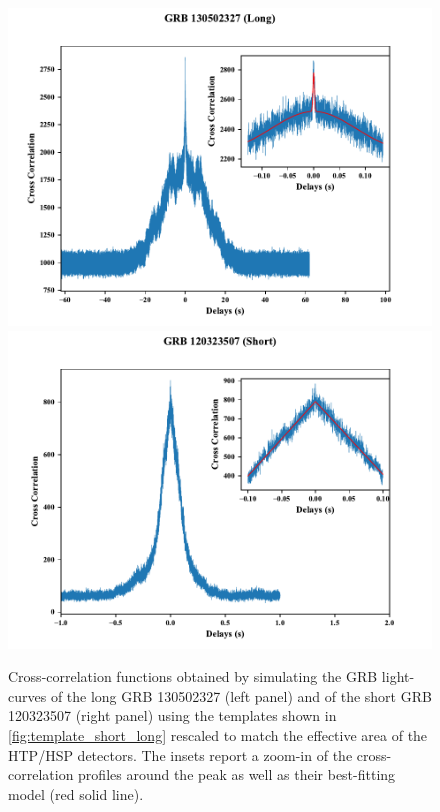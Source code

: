 \documentclass[]{spie}  %
\begin{document}
\begin{figure}[h!]
\centering
\includegraphics[scale=0.52,angle=0]{fig/CrossCorrelation_fit_LONG.pdf}
\includegraphics[scale=0.52,angle=0]{fig/CrossCorrelation_fit_Short.pdf}

\caption{Cross-correlation functions obtained by simulating the GRB light-curves of the long GRB 130502327 (left panel) and of the short GRB 120323507 (right panel) using the templates shown in \autoref{fig:template_short_long} rescaled to match the effective area of the HTP/HSP detectors. The insets report a zoom-in of the cross-correlation profiles around the peak as well as their best-fitting model (red solid line).} 
\label{fig:xc_profiles}
\end{figure}
\end{document}

